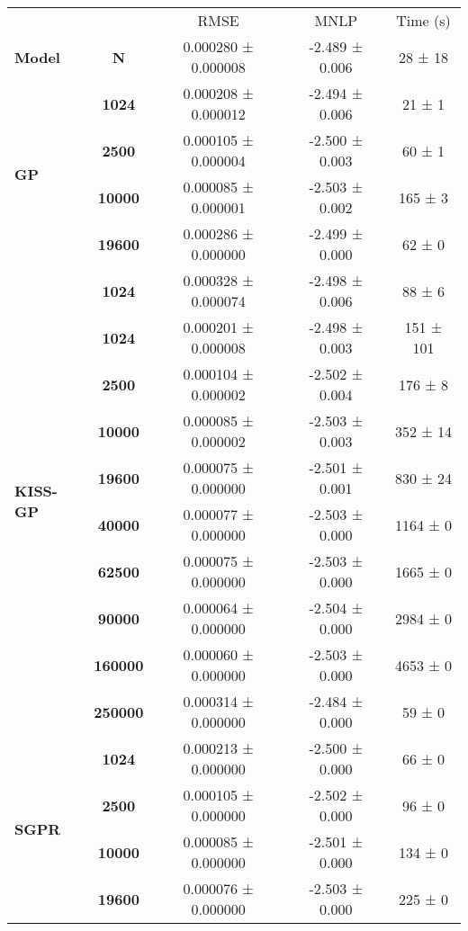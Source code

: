 \begin{tabular}{lcccc}
\toprule
           &        &                 RMSE &            MNLP &   Time (s) \\
\textbf{Model} & \textbf{N} &  0.000280 ± 0.000008 &  -2.489 ± 0.006 &    28 ± 18 \\
\midrule
\multirow{4}{*}{\textbf{GP}} & \textbf{1024  } &  0.000208 ± 0.000012 &  -2.494 ± 0.006 &     21 ± 1 \\
           & \textbf{2500  } &  0.000105 ± 0.000004 &  -2.500 ± 0.003 &     60 ± 1 \\
           & \textbf{10000 } &  0.000085 ± 0.000001 &  -2.503 ± 0.002 &    165 ± 3 \\
           & \textbf{19600 } &  0.000286 ± 0.000000 &  -2.499 ± 0.000 &     62 ± 0 \\
\cline{1-5}
\multirow{10}{*}{\textbf{KISS-GP}} & \textbf{1024  } &  0.000328 ± 0.000074 &  -2.498 ± 0.006 &     88 ± 6 \\
           & \textbf{1024  } &  0.000201 ± 0.000008 &  -2.498 ± 0.003 &  151 ± 101 \\
           & \textbf{2500  } &  0.000104 ± 0.000002 &  -2.502 ± 0.004 &    176 ± 8 \\
           & \textbf{10000 } &  0.000085 ± 0.000002 &  -2.503 ± 0.003 &   352 ± 14 \\
           & \textbf{19600 } &  0.000075 ± 0.000000 &  -2.501 ± 0.001 &   830 ± 24 \\
           & \textbf{40000 } &  0.000077 ± 0.000000 &  -2.503 ± 0.000 &   1164 ± 0 \\
           & \textbf{62500 } &  0.000075 ± 0.000000 &  -2.503 ± 0.000 &   1665 ± 0 \\
           & \textbf{90000 } &  0.000064 ± 0.000000 &  -2.504 ± 0.000 &   2984 ± 0 \\
           & \textbf{160000} &  0.000060 ± 0.000000 &  -2.503 ± 0.000 &   4653 ± 0 \\
           & \textbf{250000} &  0.000314 ± 0.000000 &  -2.484 ± 0.000 &     59 ± 0 \\
\cline{1-5}
\multirow{8}{*}{\textbf{SGPR}} & \textbf{1024  } &  0.000213 ± 0.000000 &  -2.500 ± 0.000 &     66 ± 0 \\
           & \textbf{2500  } &  0.000105 ± 0.000000 &  -2.502 ± 0.000 &     96 ± 0 \\
           & \textbf{10000 } &  0.000085 ± 0.000000 &  -2.501 ± 0.000 &    134 ± 0 \\
           & \textbf{19600 } &  0.000076 ± 0.000000 &  -2.503 ± 0.000 &    225 ± 0 \\

\end{tabular}
